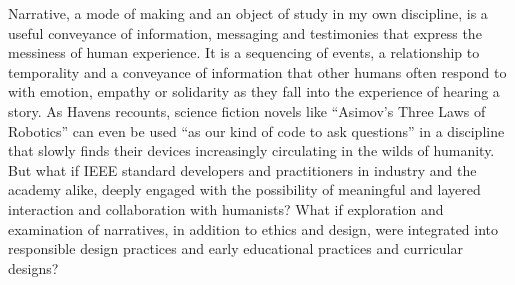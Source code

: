 \documentclass[11pt,dvipdfm]{article}
\begin{document}
Narrative, a mode of making and an object of study in my own discipline, is a useful conveyance of information, messaging and testimonies that express the messiness of human experience.  It is a sequencing of events, a relationship to temporality and a conveyance of information that other humans often respond to with emotion, empathy or solidarity as they fall into the experience of hearing a story.  As Havens recounts, science fiction novels like “Asimov’s Three Laws of Robotics” can even be used “as our kind of code to ask questions” in a discipline that slowly finds their devices increasingly circulating in the wilds of humanity.  But what if IEEE standard developers and practitioners in industry and the academy alike, deeply engaged with the possibility of meaningful and layered interaction and collaboration with humanists?  What if exploration and examination of narratives, in addition to ethics and design, were integrated into responsible design practices and early educational practices and curricular designs?  
\end{document}
